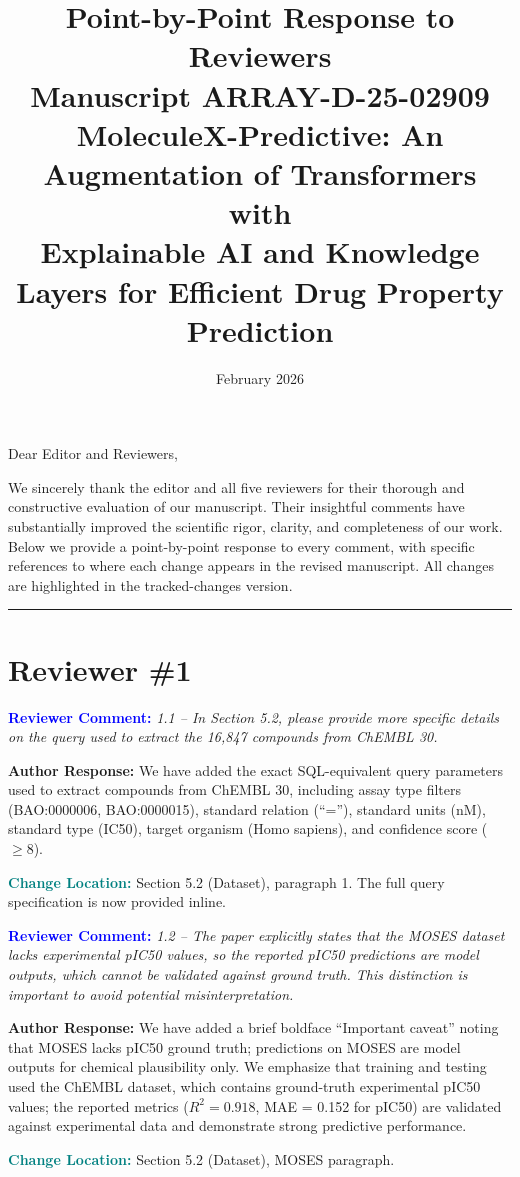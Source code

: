 \documentclass[12pt]{article}
\title{Point-by-Point Response to Reviewers\\[0.5em]
\large Manuscript ARRAY-D-25-02909\\
MoleculeX-Predictive: An Augmentation of Transformers with\\Explainable AI and Knowledge Layers for Efficient Drug Property Prediction}
\author{}
\date{February 2026}
\newcommand{\RC}[1]{\textbf{\textcolor{blue}{Reviewer Comment:}} \textit{#1}\vspace{0.3em}}
\newcommand{\AR}[1]{\textbf{Author Response:} #1\vspace{0.8em}}
\newcommand{\CH}[1]{\textbf{\textcolor{teal}{Change Location:}} #1\vspace{0.5em}}
\begin{document}
\maketitle

\noindent Dear Editor and Reviewers,

\medskip\noindent We sincerely thank the editor and all five reviewers for their thorough and constructive evaluation of our manuscript. Their insightful comments have substantially improved the scientific rigor, clarity, and completeness of our work. Below we provide a point-by-point response to every comment, with specific references to where each change appears in the revised manuscript. All changes are highlighted in the tracked-changes version.

\bigskip
\hrule
\bigskip

\section*{Reviewer \#1}

\RC{1.1 -- In Section 5.2, please provide more specific details on the query used to extract the 16,847 compounds from ChEMBL 30.}

\AR{We have added the exact SQL-equivalent query parameters used to extract compounds from ChEMBL 30, including assay type filters (BAO:0000006, BAO:0000015), standard relation (``=''), standard units (nM), standard type (IC50), target organism (Homo sapiens), and confidence score ($\geq 8$).}

\CH{Section 5.2 (Dataset), paragraph 1. The full query specification is now provided inline.}

\bigskip

\RC{1.2 -- The paper explicitly states that the MOSES dataset lacks experimental pIC50 values, so the reported pIC50 predictions are model outputs, which cannot be validated against ground truth. This distinction is important to avoid potential misinterpretation.}

\AR{We have added a brief boldface ``Important caveat'' noting that MOSES lacks pIC50 ground truth; predictions on MOSES are model outputs for chemical plausibility only. We emphasize that training and testing used the ChEMBL dataset, which contains ground-truth experimental pIC50 values; the reported metrics ($R^2 = 0.918$, MAE = 0.152 for pIC50) are validated against experimental data and demonstrate strong predictive performance.}

\CH{Section 5.2 (Dataset), MOSES paragraph.}
\end{document}
